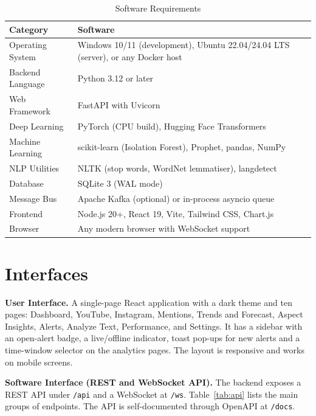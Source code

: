\documentclass[12pt,a4paper]{report}
\newcommand{\cellpadding}{\renewcommand{\arraystretch}{1.2}}
\begin{document}
\begin{table}[H]
\centering
\cellpadding
\caption{Software Requirements}
\label{tab:sw}
\begin{tabular}{|P{4cm}|P{9.8cm}|}
\hline
\textbf{Category} & \textbf{Software} \\
\hline
Operating System & Windows 10/11 (development), Ubuntu 22.04/24.04 LTS (server), or any Docker host \\
\hline
Backend Language & Python 3.12 or later \\
\hline
Web Framework & FastAPI with Uvicorn \\
\hline
Deep Learning & PyTorch (CPU build), Hugging Face Transformers \\
\hline
Machine Learning & scikit-learn (Isolation Forest), Prophet, pandas, NumPy \\
\hline
NLP Utilities & NLTK (stop words, WordNet lemmatiser), langdetect \\
\hline
Database & SQLite 3 (WAL mode) \\
\hline
Message Bus & Apache Kafka (optional) or in-process asyncio queue \\
\hline
Frontend & Node.js 20+, React 19, Vite, Tailwind CSS, Chart.js \\
\hline
Browser & Any modern browser with WebSocket support \\
\hline
\end{tabular}
\end{table}

\section{Interfaces}

\textbf{User Interface.} A single-page React application with a dark theme and ten pages: Dashboard, YouTube, Instagram, Mentions, Trends and Forecast, Aspect Insights, Alerts, Analyze Text, Performance, and Settings. It has a sidebar with an open-alert badge, a live/offline indicator, toast pop-ups for new alerts and a time-window selector on the analytics pages. The layout is responsive and works on mobile screens.

\textbf{Software Interface (REST and WebSocket API).} The backend exposes a REST API under \texttt{/api} and a WebSocket at \texttt{/ws}. Table~\ref{tab:api} lists the main groups of endpoints. The API is self-documented through OpenAPI at \texttt{/docs}.
\end{document}
